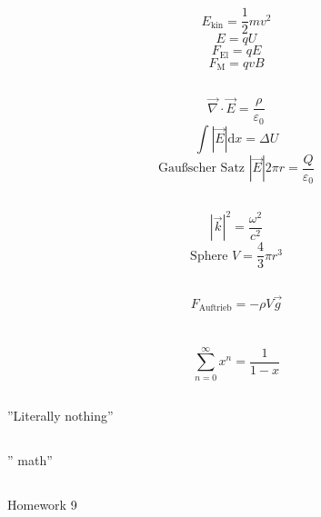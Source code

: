 \documentclass[12pt]{report}
\newcommand{\vabla}{\vec{\nabla}}
\newcommand{\vepsilon}{\varepsilon}
\newcommand{\dd}{\mathrm{d}}
\begin{document}
\section{}

\subsection{}
\[E_\mathrm{kin}=\frac{1}{2}mv^2\]
\[E=qU\]
\[F_\mathrm{El}=qE\]
\[F_\mathrm{M}=qvB\]

\subsection{}
\[\vabla\cdot\vec{E}=\frac{\rho}{\vepsilon_0}\]
\[\int|\vec{E}|\dd x=\Delta U\]
\[\textrm{Gau\ss scher Satz }|\vec{E}|2\pi r=\frac{Q}{\vepsilon_0}\]

\subsection{}
\[|\vec{k}|^2=\frac{\omega^2}{c^2}\]
\[\textrm{Sphere }V=\frac{4}{3}\pi r^3\]

\subsection{} 
\[F_\mathrm{Auftrieb}=-\rho V\vec{g}\]

\section{}

\subsection{}
\[\sum_{n=0}^\infty x^n=\frac{1}{1-x}\]

\subsection{}
''Literally nothing''

\subsection{}
'' math''

\subsection{}
Homework 9

\section{}
\end{document}
